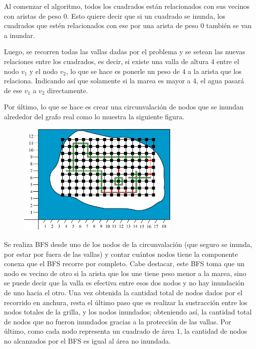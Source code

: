 \documentclass[a4paper, 12pt]{article}
\begin{document}
Al comenzar el algoritmo, todos los cuadrados están relacionados con sus vecinos con aristas de peso 0. Esto quiere decir que si un cuadrado se inunda, los cuadrados que estén relacionados con ese por una arista de peso 0 también se van a inundar. 

Luego, se recorren todas las vallas dadas por el problema y se setean las nuevas relaciones entre los cuadrados, es decir, si existe una valla de altura 4 entre el nodo $v_1$ y el nodo $v_2$, lo que se hace es ponerle un peso de 4 a la arista que los relaciona. Indicando así que solamente si la marea es mayor a 4, el agua pasará de ese $v_1$ a $v_2$ directamente.

Por último, lo que se hace es crear una circunvalación de nodos que se inundan alrededor del grafo real como lo muestra la siguiente figura.

\begin{figure}[H]
\centering
\includegraphics[width=0.7\textwidth]{imagenes/im3_ej2.jpg} 
\end{figure}

Se realiza BFS desde uno de los nodos de la circunvalación (que seguro se inunda, por estar por fuera de las vallas) y contar cuántos nodos tiene la componente conexa que el BFS recorre por completo. Cabe destacar, este BFS toma que un nodo es vecino de otro si la arista que los une tiene peso menor a la marea, sino se puede decir que la valla es efectiva entre esos dos nodos y no hay inundación de uno hacia el otro. Una vez obtenida la cantidad total de nodos dados por el recorrido en anchura, resta el último paso que es realizar la sustracción entre los nodos totales de la grilla, y los nodos inundados; obteniendo así, la cantidad total de nodos que no fueron inundados gracias a la protección de las vallas. Por último, como cada nodo representa un cuadrado de área 1, la cantidad de nodos no alcanzados por el BFS es igual al área no inundada.
\end{document}
